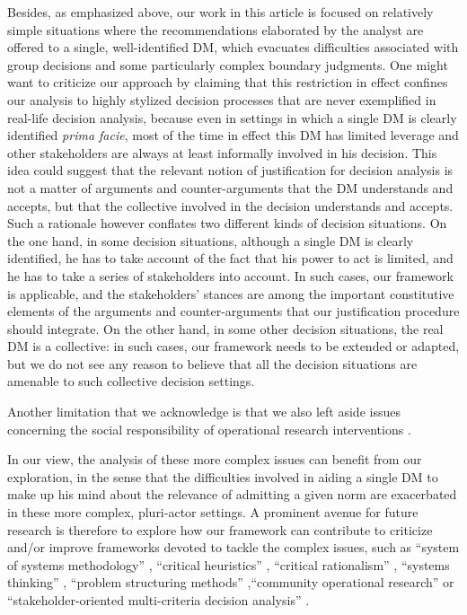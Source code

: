 \documentclass[preprint, french, english, 11pt, authoryear]{elsarticle}%
\begin{document}
Besides, as emphasized above, our work in this article is focused on relatively simple situations where the recommendations elaborated by the analyst are offered to a single, well-identified \ac{DM}, which evacuates difficulties associated with group decisions and some particularly complex boundary judgments. One might want to criticize our approach by claiming that this restriction in effect confines our analysis to highly stylized decision processes that are never exemplified in real-life decision analysis, because even in settings in which a single \ac{DM} is clearly identified \emph{prima facie}, most of the time in effect this \ac{DM} has limited leverage and other stakeholders are always at least informally involved in his decision. This idea could suggest that the relevant notion of justification for decision analysis is not a matter of arguments and counter-arguments that the \ac{DM} understands and accepts, but that the collective involved in the decision understands and accepts. Such a rationale however conflates two different kinds of decision situations. On the one hand, in some decision situations, although a single \ac{DM} is clearly identified, he has to take account of the fact that his power to act is limited, and he has to take a series of stakeholders into account. In such cases, our framework is applicable, and the stakeholders' stances are among the important constitutive elements of the arguments and counter-arguments that our justification procedure should integrate. On the other hand, in some other decision situations, the real \ac{DM} is a collective: in such cases, our framework needs to be extended or adapted, but we do not see any reason to believe that all the decision situations are amenable to such collective decision settings. 

Another limitation that we acknowledge is that we also left aside issues concerning the social responsibility of operational research interventions \citep{ackoff_social_1974,gallo_operations_2004}.

In our view, the analysis of these more complex issues can benefit from our exploration, in the sense that the difficulties involved in aiding a single \ac{DM} to make up his mind about the relevance of admitting a given norm are exacerbated in these more complex, pluri-actor settings. A prominent avenue for future research is therefore to explore how our framework can contribute to criticize and/or improve frameworks devoted to tackle the complex issues, such as ``system of systems methodology'' \citep{jackson_towards_1984}, ``critical heuristics'' \citep{ulrich_critical_1987}, ``critical rationalism'' \citep{ormerod_critical_2014}, ``systems thinking'' \citep{mingers_review_2010}, ``problem structuring methods'' \citep{hector_problem-structuring_2009},``community operational research'' \citep{johnson_emerging_2018} or ``stakeholder-oriented multi-criteria decision analysis'' \citep{de_brucker_multi-criteria_2013}.
\end{document}
